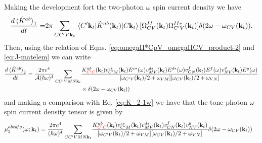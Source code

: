 \documentclass{article}
\newcommand{\kt}{\mathbf{k}_{t}}
\begin{document}
Making the development fort the two-photon $\omega$ spin current density
we have 
\begin{equation*}
\begin{split}
\frac{d \ev*{\hat{K}^{ab}}_{1}}{dt} =& 2\pi \sum_{CC'V\kt} \mel*{C'\kt}
{\hat{K}^{ab}(\kt)}{C\kt} [\Omega^{II}_{CV}(\kt) \Omega^{II*}_{C'V}(\kt)] 
\delta(2\omega - \omega_{CV}(\kt)) . \\
\end{split}
\end{equation*}
Then, using the relation of Eqns. \eqref{eq:omegaII*CpV_omegaIICV_product-2}
and \eqref{eq:J-matelem} we can write
\begin{equation}
\begin{split}
\frac{d\ev*{\hat{K}^{ab}}_{2}}{dt} = \frac{2 \pi e^{4}}{\mathcal{A} 
(\hbar \omega)^{4}} \sum_{CC'VMN\kt} & \frac{K^{ab}_{\color{red}{C'C}}(\kt) 
v^{c*}_{C'M}(\kt)E^{c*}(\omega) v^{d*}_{MV}(\kt) E^{d*}(\omega) 
v^{f}_{CN}(\kt) E^{f}(\omega) v^{g}_{NV}(\kt) E^{g}(\omega) }
{[\omega_{C'V}(\kt)/2 + \omega_{VM}] [\omega_{CV}(\kt)/2 + \omega_{VN}]} \\
& \times \delta(2\omega - \omega_{CV}(\kt))
\end{split}
\end{equation}
and making a comparison with Eq. \eqref{eq:K_2-1w} we have that the tone-photon
$\omega$ spin current density tensor is given by
\begin{equation}
\begin{split}
\mu^{abcdfg}_{2}(\omega;\kt) = \frac{2 \pi e^{4}}{(\hbar \omega)^{4}} 
\sum_{CC'VMN\kt} & \frac{K^{ab}_{\color{red}{C'C}}(\kt) 
v^{c*}_{C'M}(\kt) v^{d*}_{MV}(\kt) v^{f}_{CN}(\kt) v^{g}_{NV}(\kt) }
{[\omega_{C'V}(\kt)/2 + \omega_{VM}] [\omega_{CV}(\kt)/2 + \omega_{VN}]} 
\delta(2\omega - \omega_{CV}(\kt))
\end{split}
\end{equation}
\end{document}
